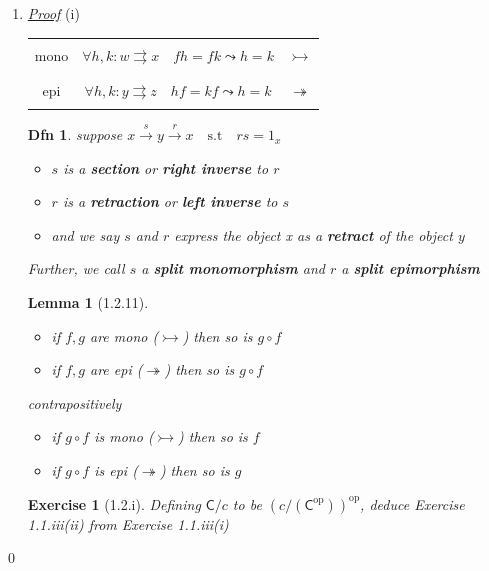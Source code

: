 \documentclass{article}
\theoremstyle{spacious}
\newtheorem*{dfn}{Dfn}
\newtheorem*{lem}{Lemma}
\newtheorem*{prm}{Exercise}
\newenvironment{pf}{\begin{enumerate} \item[] \textit{\underline{Proof}} }{\end{enumerate}\qed}
\renewcommand{\:}{\vcentcolon=} %
\newcommand{\st}{\quad \text{s.t} \quad}
\newcommand{\epi}{\twoheadrightarrow}
\newcommand{\mono}{\rightarrowtail}
\newcommand{\op}{\mathrm{op}}
\begin{document}
\begin{pf}{(i)}
\begin{tabular}{|c|c|c|}
    \hline
    &&\\
    mono    & \(\forall h,k:w \rightrightarrows x \quad fh=fk \leadsto h=k \) & \(\rightarrowtail\)\\
    &&\\
    \hline
    &&\\
    epi     & \(\forall h,k:y \rightrightarrows z \quad hf=kf \leadsto h=k \) & \(\twoheadrightarrow\)\\
    &&\\
\hline
\end{tabular}

\begin{dfn} suppose \(x \overset{s}{\longrightarrow}y \overset{r}{\longrightarrow} x \st rs=1_x\)
\begin{itemize}
    \item \(s\) is a \textbf{section} or \textbf{right inverse} to \(r\)
    \item \(r\) is a \textbf{retraction} or \textbf{left inverse} to \(s\)
    \item and we say \(s\) and \(r\) express the object x as a \textbf{retract} of the object \(y\)
\end{itemize}
Further, we call \(s\) a \textbf{split monomorphism} and \(r\) a \textbf{split epimorphism}
\end{dfn}

\begin{lem}[1.2.11]\phantom{a}
\begin{itemize}
    \item if \(f,g\) are mono (\(\mono\)) then so is \(g\circ f\)
    \item if \(f,g\) are epi (\(\epi\)) then so is \(g\circ f\)
\end{itemize}
\textit{contrapositively}
\begin{itemize}
    \item if \(g\circ f\) is mono (\(\mono\)) then so is \(f\)
    \item if \(g\circ f\) is epi (\(\epi\)) then so is \(g\)
\end{itemize}
\end{lem}

\begin{prm}[1.2.i]
    Defining \(\mathsf{C}/c\) to be \(\left(c/\left(\mathsf{C}^\op\right)\right)^\op\), deduce Exercise 1.1.iii(ii) from Exercise 1.1.iii(i)
\end{prm}


\end{pf}
\end{document}
